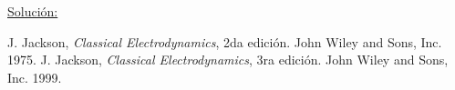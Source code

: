 \documentclass[a4paper,10pt]{article}
\numberwithin{equation}{section}
\begin{document}
\vspace{.3cm}

\underline{Solución:} \vspace{.3cm}

\begin{thebibliography}{10}
J. Jackson, \emph{Classical Electrodynamics}, 2da edición. John Wiley and Sons, Inc. 
1975.
J. Jackson, \emph{Classical Electrodynamics}, 3ra edición. John Wiley and Sons, Inc. 
1999.
\end{thebibliography}
\end{document}

